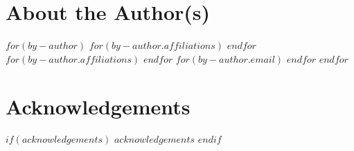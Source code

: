 \newpage


\section*{About the Author(s)}

$for(by-author)$
  {}%
  $for(by-author.affiliations)$
    \vskip 1pt{}%
  $endfor$ 
  $for(by-author.affiliations)$
    \vskip -8pt{}%
  $endfor$ 
  $for(by-author.email)$
    \vskip -8pt{}%
  $endfor$ 
  \vskip 15pt
$endfor$

\newpage


\section*{Acknowledgements}

$if(acknowledgements)$
  $acknowledgements$
$endif$

\newpage


